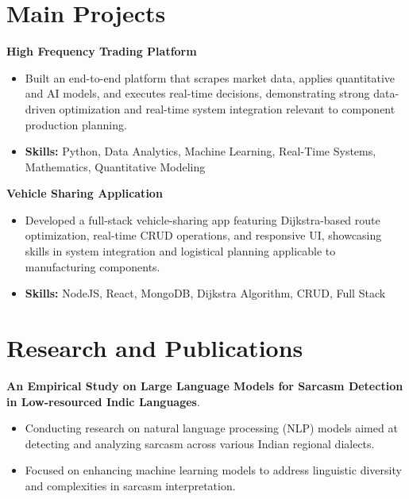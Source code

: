 \documentclass[a4paper,11pt]{article}
\begin{document}
\section{\textbf{Main Projects}}

\vspace{1mm}
  \textbf{High Frequency Trading Platform  }
\vspace{-1.5mm} %
\begin{itemize}
  \item Built an end-to-end platform that scrapes market data, applies quantitative and AI models, and executes real-time decisions, demonstrating strong data-driven optimization and real-time system integration relevant to component production planning.
\vspace{-3mm}
  \item \textbf{Skills:} Python, Data Analytics, Machine Learning, Real-Time Systems, Mathematics, Quantitative Modeling
\end{itemize}


\vspace{1mm}
   \textbf{Vehicle Sharing Application }
\vspace{-1.5mm} %
\begin{itemize}
  \item Developed a full-stack vehicle-sharing app featuring Dijkstra-based route optimization, real-time CRUD operations, and responsive UI, showcasing skills in system integration and logistical planning applicable to manufacturing components.
\vspace{-3mm}
  \item \textbf{Skills:} NodeJS, React, MongoDB, Dijkstra Algorithm, CRUD, Full Stack
\end{itemize}



\section{\textbf{Research and Publications} \hfill }
\vspace{1mm}
  \textbf{An Empirical Study on Large Language Models for Sarcasm Detection in Low-resourced Indic Languages}.
\vspace{-1mm} %
\begin{itemize}
  \item Conducting research on natural language processing (NLP) models aimed at detecting and analyzing sarcasm across various Indian regional dialects.
\vspace{-3mm}
  \item Focused on enhancing machine learning models to address linguistic diversity and complexities in sarcasm interpretation.
\end{itemize}
\end{document}
